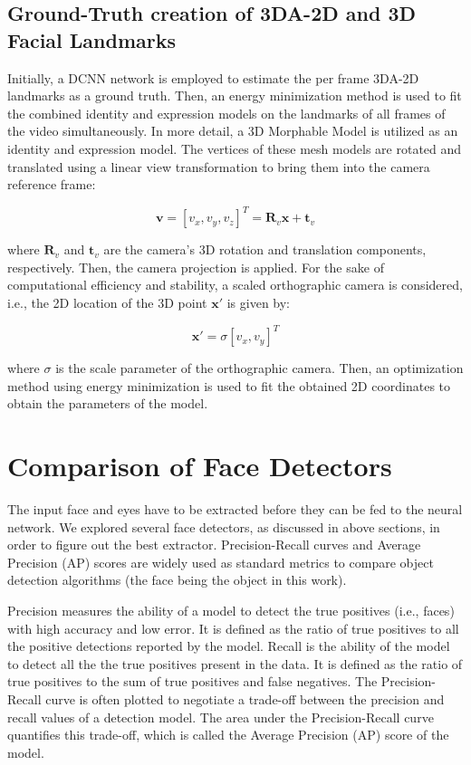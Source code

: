 \subsection{Ground-Truth creation of 3DA-2D and 3D Facial Landmarks}
Initially, a DCNN network \cite{dcnn} is employed to estimate the per frame 3DA-2D landmarks as a ground truth. Then, an energy minimization method is used to fit the combined identity and expression models on the landmarks of all frames of the video simultaneously. In more detail, a 3D Morphable Model is utilized as an identity and expression model. The vertices of these mesh models are rotated and translated using a linear view transformation to bring them into the camera reference frame:

\begin{equation}
\mathbf{v} = [v_x, v_y, v_z]^T = \mathbf{R}_v \mathbf{x} + \mathbf{t}_v
\end{equation}

where $\mathbf{R}_v$ and $\mathbf{t}_v$ are the camera's 3D rotation and translation components, respectively. Then, the camera projection is applied. For the sake of computational efficiency and stability, a scaled orthographic camera is considered, i.e., the 2D location of the 3D point $\mathbf{x}'$ is given by:

\begin{equation}
\mathbf{x}' = \sigma [v_x, v_y]^T
\end{equation}

where $\sigma$ is the scale parameter of the orthographic camera. Then, an optimization method using energy minimization is used to fit the obtained 2D coordinates to obtain the parameters of the model.


\section{Comparison of Face Detectors}
The input face and eyes have to be extracted before they can be fed to the neural network. We explored several face detectors, as discussed in above sections, in order to figure out the best extractor. Precision-Recall curves and Average Precision (AP) scores are widely used as standard metrics to compare object detection algorithms (the face being the object in this work).

Precision measures the ability of a model to detect the true positives (i.e., faces) with high accuracy and low error. It is defined as the ratio of true positives to all the positive detections reported by the model. Recall is the ability of the model to detect all the the true positives present in the data. It is defined as the ratio of true positives to the sum of true positives and false negatives. The Precision-Recall curve is often plotted to negotiate a trade-off between the precision and recall values of a detection model. The area under the Precision-Recall curve quantifies this trade-off, which is called the Average Precision (AP) score of the model.

